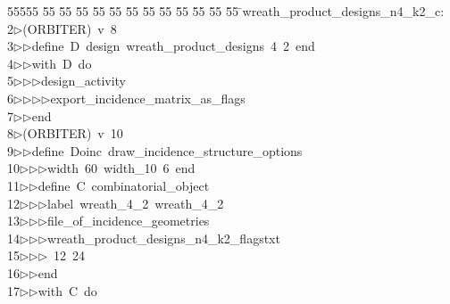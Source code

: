 %
%
\begin{tabbing}
55555 \= 55 \= 55 \= 55 \= 55 \= 55 \= 55 \= 55 \= 55 \= 55 \= 55 \= 55 \= 55 \= \>wreath\_product\_designs\_n4\_k2\_c:\\[0pt]
2\>$\triangleright$\>(ORBITER)\ v\ 8\ \\[0pt]
3\>$\triangleright$\>$\triangleright$\>define\ D\ design\ wreath\_product\_designs\ 4\ 2\ end\ \\[0pt]
4\>$\triangleright$\>$\triangleright$\>with\ D\ do\ \\[0pt]
5\>$\triangleright$\>$\triangleright$\>$\triangleright$\>design\_activity\ \\[0pt]
6\>$\triangleright$\>$\triangleright$\>$\triangleright$\>$\triangleright$\>export\_incidence\_matrix\_as\_flags\ \\[0pt]
7\>$\triangleright$\>$\triangleright$\>end\\[0pt]
8\>$\triangleright$\>(ORBITER)\ v\ 10\ \\[0pt]
9\>$\triangleright$\>$\triangleright$\>define\ Doinc\ draw\_incidence\_structure\_options\ \\[0pt]
10\>$\triangleright$\>$\triangleright$\>$\triangleright$\>width\ 60\ width\_10\ 6\ end\ \\[0pt]
11\>$\triangleright$\>$\triangleright$\>define\ C\ combinatorial\_object\ \\[0pt]
12\>$\triangleright$\>$\triangleright$\>$\triangleright$\>label\ wreath\_4\_2\ wreath\_4\_2\ \\[0pt]
13\>$\triangleright$\>$\triangleright$\>$\triangleright$\>file\_of\_incidence\_geometries\ \\[0pt]
14\>$\triangleright$\>$\triangleright$\>$\triangleright$\>wreath\_product\_designs\_n4\_k2\_flagstxt\ \\[0pt]
15\>$\triangleright$\>$\triangleright$\>$\triangleright$\ 12\ 24\ \\[0pt]
16\>$\triangleright$\>$\triangleright$\>end\ \\[0pt]
17\>$\triangleright$\>$\triangleright$\>with\ C\ do\ \\[0pt]

\end{tabbing}
